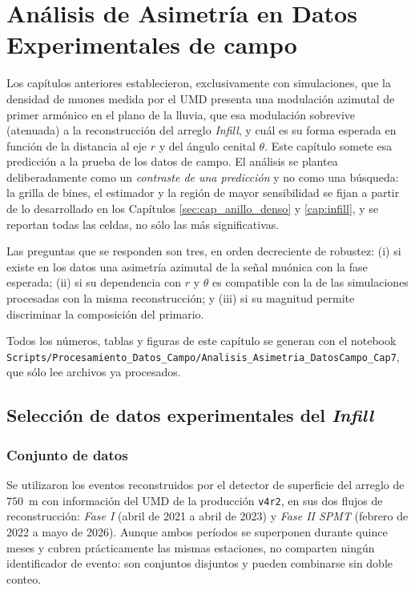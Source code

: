 
\section{Análisis de Asimetría en Datos Experimentales de campo}
\label{sec:datos_reales}

Los capítulos anteriores establecieron, exclusivamente con simulaciones, que la densidad de muones medida por el UMD presenta una modulación azimutal de primer armónico en el plano de la lluvia, que esa modulación sobrevive (atenuada) a la reconstrucción del arreglo \textit{Infill}, y cuál es su forma esperada en función de la distancia al eje $r$ y del ángulo cenital $\theta$. Este capítulo somete esa predicción a la prueba de los datos de campo. El análisis se plantea deliberadamente como un \emph{contraste de una predicción} y no como una búsqueda: la grilla de bines, el estimador y la región de mayor sensibilidad se fijan a partir de lo desarrollado en los Capítulos \ref{sec:cap_anillo_denso} y \ref{cap:infill}, y se reportan todas las celdas, no sólo las más significativas.

Las preguntas que se responden son tres, en orden decreciente de robustez: (i) si existe en los datos una asimetría azimutal de la señal muónica con la fase esperada; (ii) si su dependencia con $r$ y $\theta$ es compatible con la de las simulaciones procesadas con la misma reconstrucción; y (iii) si su magnitud permite discriminar la composición del primario.

Todos los números, tablas y figuras de este capítulo se generan con el notebook \texttt{Scripts/Procesamiento\_Datos\_Campo/Analisis\_Asimetria\_DatosCampo\_Cap7}, que sólo lee archivos ya procesados.

\subsection{Selección de datos experimentales del \textit{Infill}}
\label{subsec:seleccion_datos}

\subsubsection{Conjunto de datos}

Se utilizaron los eventos reconstruidos por el detector de superficie del arreglo de $750$~m con información del UMD de la producción \texttt{v4r2}, en sus dos flujos de reconstrucción: \textit{Fase I} (abril de 2021 a abril de 2023) y \textit{Fase II SPMT} (febrero de 2022 a mayo de 2026). Aunque ambos períodos se superponen durante quince meses y cubren prácticamente las mismas estaciones, no comparten ningún identificador de evento: son conjuntos disjuntos y pueden combinarse sin doble conteo.

